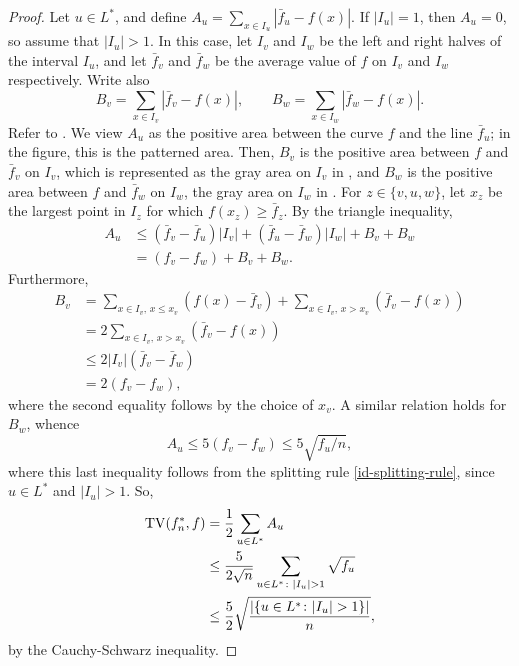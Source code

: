 \begin{proof}
  Let $u \in L^*$, and define
  $A_u = \sum_{x \in I_u} |\bar{f}_u - f(x)|$. If $|I_u| = 1$, then
  $A_u = 0$, so assume that $|I_u| > 1$. In this case, let $I_v$ and
  $I_w$ be the left and right halves of the interval $I_u$, and let
  $\bar{f}_v$ and $\bar{f}_w$ be the average value of $f$ on $I_v$ and
  $I_w$ respectively. Write also
  \[
    B_v = \sum_{x \in I_v} |\bar{f}_v - f(x)| , \qquad   B_w = \sum_{x \in I_w} |\bar{f}_w - f(x)| .
  \]
  Refer to . We view $A_u$ as the positive area
  between the curve $f$ and the line $\bar{f}_u$; in the figure, this
  is the patterned area. Then, $B_v$ is the positive area between $f$
  and $\bar{f}_v$ on $I_v$, which is represented as the gray area on
  $I_v$ in , and $B_w$ is the positive area between
  $f$ and $\bar{f}_w$ on $I_w$, the gray area on $I_w$ in
  . For $z \in \{v, u, w\}$, let $x_z$ be the largest
  point in $I_z$ for which $f(x_z) \ge \bar{f}_z$.  By the triangle
  inequality,
  \begin{align*}
    A_u &\le (\bar{f}_v - \bar{f}_u) |I_v| + (\bar{f}_u - \bar{f}_w) |I_w| + B_v + B_w \\
        &= (f_v - f_w) + B_v + B_w .
  \end{align*}
  Furthermore,
  \begin{align*}
    B_v &= \sum_{x \in I_v, \, x \le x_v} (f(x) - \bar{f}_v) + \sum_{x \in I_v, \, x > x_v} (\bar{f}_v - f(x)) \\
        &= 2 \sum_{x \in I_v, \, x > x_v} (\bar{f}_v - f(x)) \\
        &\le 2 |I_v| (\bar{f}_v - \bar{f}_w) \\
        &= 2 (f_v - f_w) ,
  \end{align*}
  where the second equality follows by the choice of $x_v$. A similar
  relation holds for $B_w$, whence
  \[
    A_u \le 5 (f_v - f_w) \le 5 \sqrt{f_u/n} ,
  \]
  where this last inequality follows from the splitting rule
  \eqref{id-splitting-rule}, since $u \in L^*$ and $|I_u| > 1$. So,
  \begin{align*}
    \TV(f^*_n, f) &= \frac{1}{2} \sum_{u \in L^*} A_u \\
                  &\le \frac{5}{2 \sqrt{n}} \sum_{u \in L^* \colon |I_u| > 1} \sqrt{f_u} \\
                  &\le \frac{5}{2} \sqrt{\frac{|\{u \in L^* \colon |I_u| > 1\}|}{n}} ,
  \end{align*}
  by the Cauchy-Schwarz inequality.
\end{proof}

